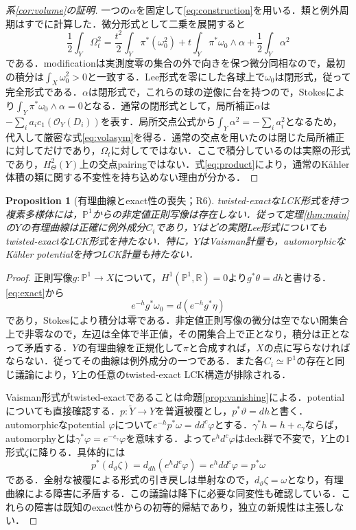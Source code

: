 \documentclass[12pt]{amsart}
\newtheorem{prop}[thm]{Proposition}
\theoremstyle{definition}
\theoremstyle{remark}
\numberwithin{equation}{section}
\newcommand{\cO}{\mathcal{O}}
\newcommand{\R}{\mathbb{R}}
\newcommand{\mP}{\mathbb{P}}
\begin{document}
\begin{proof}[系\ref{cor:volume}の証明]
一つの$\alpha$を固定して\eqref{eq:construction}を用いる．類と例外周期はすでに計算した．微分形式として二乗を展開すると
\begin{equation}\label{eq:volume}
 \frac12\int_Y\Omega_t^2
 =\frac{t^2}{2}\int_Y\pi^*(\omega_0^2)
 +t\int_Y\pi^*\omega_0\wedge\alpha+\frac12\int_Y\alpha^2
\end{equation}
である．modificationは実測度零の集合の外で向きを保つ微分同相なので，最初の積分は$\int_X\omega_0^2>0$と一致する．Lee形式を零にした各球上で$\omega_0$は閉形式，従って完全形式である．$\alpha$は閉形式で，これらの球の逆像に台を持つので，Stokesにより$\int_Y\pi^*\omega_0\wedge\alpha=0$となる．通常の閉形式として，局所補正$\alpha$は$-\sum_i a_ic_1(\cO_Y(D_i))$を表す．局所交点公式から$\int_Y\alpha^2=-\sum_i a_i^2$となるため，代入して厳密な式\eqref{eq:volasym}を得る．通常の交点を用いたのは閉じた局所補正に対してだけであり，$\Omega_t$に対してではない．ここで積分しているのは実際の形式であり，$H^2_\Theta(Y)$上の交点pairingではない．式\eqref{eq:product}により，通常のK\"ahler体積の類に関する不変性を持ち込めない理由が分かる．
\end{proof}

\begin{prop}[有理曲線とexact性の喪失；R6]\label{prop:rational}
twisted-exactなLCK形式を持つ複素多様体には，$\mP^1$からの非定値正則写像は存在しない．従って定理\ref{thm:main}の$Y$の有理曲線は正確に例外成分$C_i$であり，$Y$は\emph{どの}実閉Lee形式についてもtwisted-exactなLCK形式を持たない．特に，$Y$はVaisman計量も，automorphicなK\"ahler potentialを持つLCK計量も持たない．
\end{prop}
\begin{proof}
正則写像$g:\mP^1\to X$について，$H^1(\mP^1,\R)=0$より$g^*\theta=dh$と書ける．\eqref{eq:exact}から
\[
 e^{-h}g^*\omega_0=d(e^{-h}g^*\eta)
\]
であり，Stokesにより積分は零である．非定値正則写像の微分は空でない開集合上で非零なので，左辺は全体で半正値，その開集合上で正となり，積分は正となって矛盾する．$Y$の有理曲線を正規化して$\pi$と合成すれば，$X$の点に写らなければならない．従ってその曲線は例外成分の一つである．また各$C_i\simeq\mP^1$の存在と同じ議論により，$Y$上の任意のtwisted-exact LCK構造が排除される．

Vaisman形式がtwisted-exactであることは命題\ref{prop:vanishing}による．potentialについても直接確認する．$p:\widetilde Y\to Y$を普遍被覆とし，$p^*\vartheta=dh$と書く．automorphicなpotential $\varphi$について$e^{-h}p^*\omega=dd^c\varphi$とする．$\gamma^*h=h+c_\gamma$ならば，automorphyとは$\gamma^*\varphi=e^{-c_\gamma}\varphi$を意味する．よって$e^h d^c\varphi$はdeck群で不変で，$Y$上の1形式$\zeta$に降りる．具体的には
\[
 p^*(d_\vartheta\zeta)=d_{dh}(e^h d^c\varphi)
 =e^hdd^c\varphi=p^*\omega
\]
である．全射な被覆による形式の引き戻しは単射なので，$d_\vartheta\zeta=\omega$となり，有理曲線による障害に矛盾する．この議論は降下に必要な同変性も確認している．これらの障害は既知のexact性からの初等的帰結であり，独立の新規性は主張しない．
\end{proof}
\end{document}
